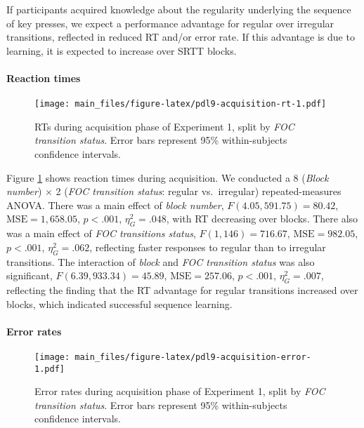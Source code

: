 \documentclass[jou]{apa6}
\theoremstyle{definition}
\theoremstyle{definition}
\theoremstyle{definition}
\theoremstyle{remark}
\begin{document}
If participants acquired knowledge about the regularity underlying the
sequence of key presses, we expect a performance advantage for regular
over irregular transitions, reflected in reduced RT and/or error rate.
If this advantage is due to learning, it is expected to increase over
SRTT blocks.

\paragraph{Reaction times}\label{reaction-times}

\begin{figure}[htbp]
\centering
\texttt{[image: main\_files/figure-latex/pdl9-acquisition-rt-1.pdf]}
\caption{\label{fig:pdl9-acquisition-rt}RTs during acquisition phase of
Experiment 1, split by \emph{FOC transition status}. Error bars
represent 95\% within-subjects confidence intervals.}
\end{figure}

Figure \ref{fig:pdl9-acquisition-rt} shows reaction times during
acquisition. We conducted a 8 (\emph{Block number}) \(\times\) 2
(\emph{FOC transition status}: regular vs.~irregular) repeated-measures
ANOVA. There was a main effect of \emph{block number},
\(F(4.05, 591.75) = 80.42\), \(\mathrm{MSE} = 1,658.05\), \(p < .001\),
\(\eta^2_G = .048\), with RT decreasing over blocks. There also was a
main effect of \emph{FOC transitions status}, \(F(1, 146) = 716.67\),
\(\mathrm{MSE} = 982.05\), \(p < .001\), \(\eta^2_G = .062\), reflecting
faster responses to regular than to irregular transitions. The
interaction of \emph{block} and \emph{FOC transition status} was also
significant, \(F(6.39, 933.34) = 45.89\), \(\mathrm{MSE} = 257.06\),
\(p < .001\), \(\eta^2_G = .007\), reflecting the finding that the RT
advantage for regular transitions increased over blocks, which indicated
successful sequence learning.

\paragraph{Error rates}\label{error-rates}

\begin{figure}[htbp]
\centering
\texttt{[image: main\_files/figure-latex/pdl9-acquisition-error-1.pdf]}
\caption{\label{fig:pdl9-acquisition-error}Error rates during acquisition
phase of Experiment 1, split by \emph{FOC transition status}. Error bars
represent 95\% within-subjects confidence intervals.}
\end{figure}
\end{document}
